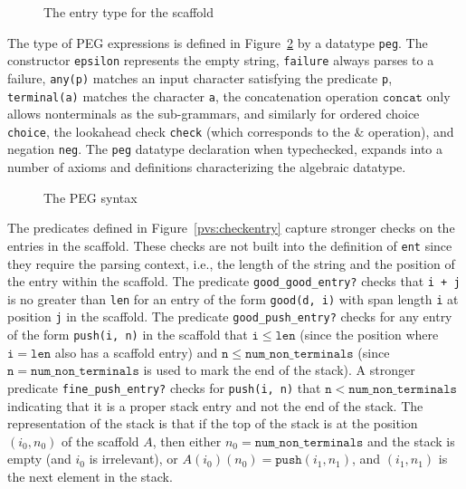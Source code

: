 \documentclass[sigplan,10pt,anonymous,review]{acmart}\settopmatter{printfolios=true,printccs=false,printacmref=false}
\begin{document}
\begin{CCSXML}
\begin{figure}[h!]
  {}
  \vspace*{-4mm}
			\caption{\small The entry type for the scaffold}
			\label{pvs:ent}
\end{figure}

The type of PEG expressions is defined in Figure~\ref{pvs:peg} by a datatype \texttt{peg}.  The
constructor \texttt{epsilon} represents the empty string,
\texttt{failure} always parses to a failure, \texttt{any(p)} matches
an input character satisfying the predicate \texttt{p},
\texttt{terminal(a)} matches the character \texttt{a}, the
concatenation operation $\mathtt{concat}$ only allows nonterminals
as the sub-grammars, and similarly for ordered choice
\texttt{choice}, the lookahead check \texttt{check} (which
corresponds to the $\&$ operation), and  negation 
\texttt{neg}\@. The \texttt{peg} datatype declaration when typechecked,
expands into a number of axioms and definitions characterizing the
algebraic datatype.  

\begin{figure}[h!]
  {}
  \vspace*{-4mm}
			\caption{\small The PEG syntax}
			\label{pvs:peg}
\end{figure}




The predicates defined in Figure~\ref{pvs:checkentry} capture stronger checks on the entries in the scaffold.
These checks are not built into the definition of \texttt{ent} since
they require the parsing context, i.e., the length of the string and the position
of the entry within the scaffold.
The predicate \texttt{good\_good\_entry?} checks that
 \texttt{i + j} is no greater than \texttt{len} 
for an entry of the form \texttt{good(d, i)} with span length \texttt{i}
at position \texttt{j} in the scaffold.  The predicate \texttt{good\_push\_entry?}
checks for any entry of the form \texttt{push(i, n)} in the scaffold
that $\mathtt{i} \leq \mathtt{len}$ (since the position where $\mathtt{i} = \mathtt{len}$ also has a scaffold entry) 
and $ \mathtt{n}\leq \mathtt{num\_non\_terminals}$ (since $\mathtt{n} = \mathtt{num\_non\_terminals}$ is used to mark the end of the stack).  A stronger predicate
\texttt{fine\_push\_entry?} checks for \texttt{push(i, n)} that $\mathtt{n} < \mathtt{num\_non\_terminals}$ indicating that it is a proper stack entry and not the
end of the stack.  The representation of the stack is that if the
top of the stack is at the position $(i_0, n_0)$ of the scaffold $A$, then
either $n_0 = \mathtt{num\_non\_terminals}$ and the stack is empty
(and $i_0$ is irrelevant), or $A(i_0)(n_0) = \mathtt{push}(i_1, n_1)$, and
$(i_1, n_1)$ is the next element in the stack.


\end{CCSXML}
\end{document}
